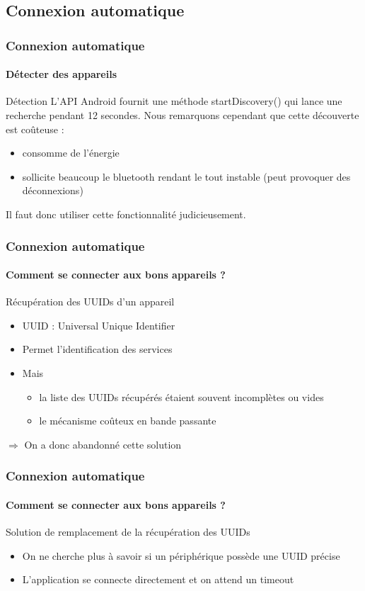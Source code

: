 \documentclass{beamer}
\begin{document}
    \subsection{Connexion automatique}
    \begin{frame}
      \frametitle{Connexion automatique}
      \framesubtitle{Détecter des appareils}
      \begin{block}{Détection}
        L'API Android fournit une méthode startDiscovery() qui lance une recherche pendant 12 secondes. Nous remarquons cependant que cette découverte est coûteuse :
        \begin{itemize}
          \item consomme de l'énergie
          \item sollicite beaucoup le bluetooth rendant le tout instable (peut provoquer des déconnexions)
        \end{itemize}
        Il faut donc utiliser cette fonctionnalité judicieusement.
      \end{block}
    \end{frame}
    \begin{frame}
      \frametitle{Connexion automatique}
      \framesubtitle{Comment se connecter aux bons appareils ?}
      \begin{block}{Récupération des UUIDs d'un appareil}
        \begin{itemize}
          \item UUID : Universal Unique Identifier
          \item Permet l'identification des services
          \item Mais
          \begin{itemize}
            \item la liste des UUIDs récupérés étaient souvent incomplètes ou vides
            \item le mécanisme coûteux en bande passante
          \end{itemize}
        \end{itemize}
        \begin{center}
          $ \Rightarrow $ On a donc abandonné cette solution
        \end{center}
      \end{block}
    \end{frame}
    \begin{frame}
      \frametitle{Connexion automatique}
      \framesubtitle{Comment se connecter aux bons appareils ?}
      \begin{block}{Solution de remplacement de la récupération des UUIDs}
        \begin{itemize}
          \item On ne cherche plus à savoir si un périphérique possède une UUID précise
          \item L'application se connecte directement et on attend un timeout
        \end{itemize}
      \end{block}
    \end{frame}
\end{document}
